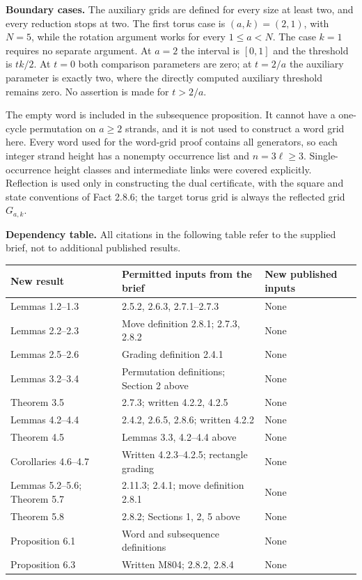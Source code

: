 \documentclass[11pt,a4paper]{article}
\begin{document}
\textbf{Boundary cases.}
The auxiliary grids are defined for every size at least two,
and every reduction stops at two. The first torus case is
$(a,k)=(2,1)$, with $N=5$, while the rotation argument works
for every $1\le a<N$. The case $k=1$ requires no separate
argument. At $a=2$ the interval is $[0,1]$ and the threshold
is $tk/2$. At $t=0$ both comparison parameters are zero;
at $t=2/a$ the auxiliary parameter is exactly two, where
the directly computed auxiliary threshold remains zero.
No assertion is made for $t>2/a$.

The empty word is included in the subsequence proposition.
It cannot have a one-cycle permutation on $a\ge2$ strands,
and it is not used to construct a word grid here. Every
word used for the word-grid proof contains all generators,
so each integer strand height has a nonempty occurrence
list and $n=3\ell\ge3$. Single-occurrence height classes
and intermediate links were covered explicitly. Reflection
is used only in constructing the dual certificate, with
the square and state conventions of Fact 2.8.6; the target
torus grid is always the reflected grid $G_{a,k}$.

\textbf{Dependency table.}
All citations in the following table refer to the supplied
brief, not to additional published results.

\begin{center}
\begin{tabularx}{\textwidth}{@{}p{}X >{\raggedright\arraybackslash}p{}@{}}
\toprule
New result & Permitted inputs from the brief & New published inputs\\
\midrule
Lemmas 1.2--1.3 & 2.5.2, 2.6.3, 2.7.1--2.7.3 & None\\
Lemmas 2.2--2.3 & Move definition 2.8.1; 2.7.3, 2.8.2 & None\\
Lemmas 2.5--2.6 & Grading definition 2.4.1 & None\\
Lemmas 3.2--3.4 & Permutation definitions; Section 2 above & None\\
Theorem 3.5 & 2.7.3; written 4.2.2, 4.2.5 & None\\
Lemmas 4.2--4.4 & 2.4.2, 2.6.5, 2.8.6; written 4.2.2 & None\\
Theorem 4.5 & Lemmas 3.3, 4.2--4.4 above & None\\
Corollaries 4.6--4.7 & Written 4.2.3--4.2.5; rectangle grading & None\\
Lemmas 5.2--5.6; Theorem 5.7 & 2.11.3; 2.4.1; move definition 2.8.1 & None\\
Theorem 5.8 & 2.8.2; Sections 1, 2, 5 above & None\\
Proposition 6.1 & Word and subsequence definitions & None\\
Proposition 6.3 & Written M804; 2.8.2, 2.8.4 & None\\
\bottomrule
\end{tabularx}
\end{center}
\end{document}
